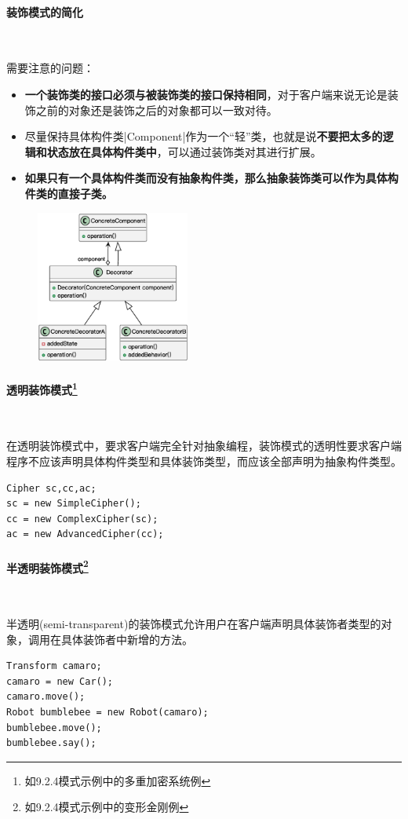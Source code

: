 \paragraph*{装饰模式的简化}~{} \par
需要注意的问题：
\begin{itemize}
    \item \textbf{一个装饰类的接口必须与被装饰类的接口保持相同}，对于客户端来说无论是装饰之前的对象还是装饰之后的对象都可以一致对待。
    \item 尽量保持具体构件类\sverb|Component|\;作为一个“轻”类，也就是说\textbf{不要把太多的逻辑和状态放在具体构件类中}，可以通过装饰类对其进行扩展。
    \item \textbf{如果只有一个具体构件类而没有抽象构件类，那么抽象装饰类可以作为具体构件类的直接子类。}
\end{itemize}
\begin{figure}[H]
    \vspace{-0.5em}
	\centering
	\includegraphics[width=0.45\textwidth]{images/装饰模式拓展.eps}
    \vspace{-1em}
\end{figure}


\paragraph*{透明装饰模式\footnote{如9.2.4模式示例中的多重加密系统例}}~{}  \par
在透明装饰模式中，要求客户端完全针对抽象编程，装饰模式的透明性要求客户端程序不应该声明具体构件类型和具体装饰类型，而应该全部声明为抽象构件类型。
\begin{lstlisting}
Cipher sc,cc,ac;
sc = new SimpleCipher();
cc = new ComplexCipher(sc);
ac = new AdvancedCipher(cc);
\end{lstlisting}

\paragraph*{半透明装饰模式\footnote{如9.2.4模式示例中的变形金刚例}}~{}  \par
半透明(semi-transparent)的装饰模式允许用户在客户端声明具体装饰者类型的对象，调用在具体装饰者中新增的方法。
\begin{lstlisting}
Transform camaro;
camaro = new Car();
camaro.move();
Robot bumblebee = new Robot(camaro);
bumblebee.move();
bumblebee.say();
\end{lstlisting}